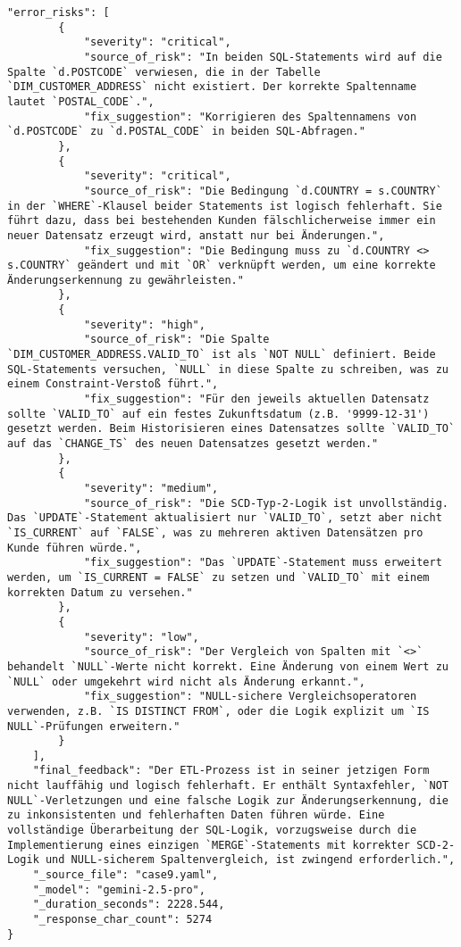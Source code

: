 \begin{lstlisting}[caption={Ausgabe: GEMINI 2.5 Pro Anwendungsfall 9 Konsistenzdurchlauf},label={gemini_case9_prompt2}]
    "error_risks": [
        {
            "severity": "critical",
            "source_of_risk": "In beiden SQL-Statements wird auf die Spalte `d.POSTCODE` verwiesen, die in der Tabelle `DIM_CUSTOMER_ADDRESS` nicht existiert. Der korrekte Spaltenname lautet `POSTAL_CODE`.",
            "fix_suggestion": "Korrigieren des Spaltennamens von `d.POSTCODE` zu `d.POSTAL_CODE` in beiden SQL-Abfragen."
        },
        {
            "severity": "critical",
            "source_of_risk": "Die Bedingung `d.COUNTRY = s.COUNTRY` in der `WHERE`-Klausel beider Statements ist logisch fehlerhaft. Sie führt dazu, dass bei bestehenden Kunden fälschlicherweise immer ein neuer Datensatz erzeugt wird, anstatt nur bei Änderungen.",
            "fix_suggestion": "Die Bedingung muss zu `d.COUNTRY <> s.COUNTRY` geändert und mit `OR` verknüpft werden, um eine korrekte Änderungserkennung zu gewährleisten."
        },
        {
            "severity": "high",
            "source_of_risk": "Die Spalte `DIM_CUSTOMER_ADDRESS.VALID_TO` ist als `NOT NULL` definiert. Beide SQL-Statements versuchen, `NULL` in diese Spalte zu schreiben, was zu einem Constraint-Verstoß führt.",
            "fix_suggestion": "Für den jeweils aktuellen Datensatz sollte `VALID_TO` auf ein festes Zukunftsdatum (z.B. '9999-12-31') gesetzt werden. Beim Historisieren eines Datensatzes sollte `VALID_TO` auf das `CHANGE_TS` des neuen Datensatzes gesetzt werden."
        },
        {
            "severity": "medium",
            "source_of_risk": "Die SCD-Typ-2-Logik ist unvollständig. Das `UPDATE`-Statement aktualisiert nur `VALID_TO`, setzt aber nicht `IS_CURRENT` auf `FALSE`, was zu mehreren aktiven Datensätzen pro Kunde führen würde.",
            "fix_suggestion": "Das `UPDATE`-Statement muss erweitert werden, um `IS_CURRENT = FALSE` zu setzen und `VALID_TO` mit einem korrekten Datum zu versehen."
        },
        {
            "severity": "low",
            "source_of_risk": "Der Vergleich von Spalten mit `<>` behandelt `NULL`-Werte nicht korrekt. Eine Änderung von einem Wert zu `NULL` oder umgekehrt wird nicht als Änderung erkannt.",
            "fix_suggestion": "NULL-sichere Vergleichsoperatoren verwenden, z.B. `IS DISTINCT FROM`, oder die Logik explizit um `IS NULL`-Prüfungen erweitern."
        }
    ],
    "final_feedback": "Der ETL-Prozess ist in seiner jetzigen Form nicht lauffähig und logisch fehlerhaft. Er enthält Syntaxfehler, `NOT NULL`-Verletzungen und eine falsche Logik zur Änderungserkennung, die zu inkonsistenten und fehlerhaften Daten führen würde. Eine vollständige Überarbeitung der SQL-Logik, vorzugsweise durch die Implementierung eines einzigen `MERGE`-Statements mit korrekter SCD-2-Logik und NULL-sicherem Spaltenvergleich, ist zwingend erforderlich.",
    "_source_file": "case9.yaml",
    "_model": "gemini-2.5-pro",
    "_duration_seconds": 2228.544,
    "_response_char_count": 5274
}
\end{lstlisting}


